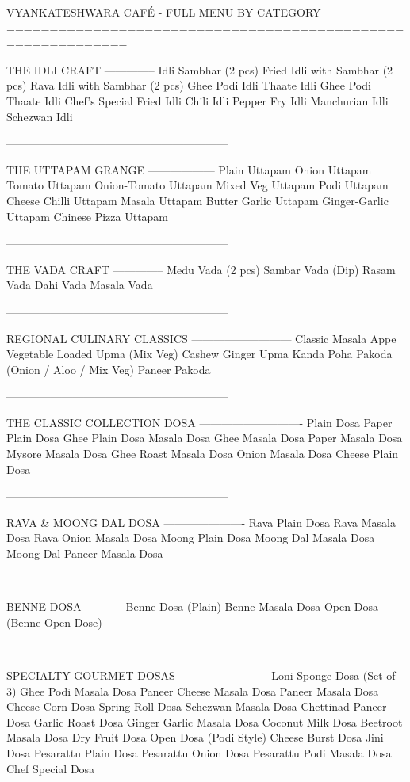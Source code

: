 VYANKATESHWARA CAFÉ - FULL MENU BY CATEGORY
============================================================

THE IDLI CRAFT
--------------
Idli Sambhar (2 pcs)
Fried Idli with Sambhar (2 pcs)
Rava Idli with Sambhar (2 pcs)
Ghee Podi Idli
Thaate Idli
Ghee Podi Thaate Idli
Chef's Special Fried Idli
Chili Idli
Pepper Fry Idli
Manchurian Idli
Schezwan Idli

------------------------------------------------------------

THE UTTAPAM GRANGE
------------------
Plain Uttapam
Onion Uttapam
Tomato Uttapam
Onion-Tomato Uttapam
Mixed Veg Uttapam
Podi Uttapam
Cheese Chilli Uttapam
Masala Uttapam
Butter Garlic Uttapam
Ginger-Garlic Uttapam
Chinese Pizza Uttapam

------------------------------------------------------------

THE VADA CRAFT
--------------
Medu Vada (2 pcs)
Sambar Vada (Dip)
Rasam Vada
Dahi Vada
Masala Vada

------------------------------------------------------------

REGIONAL CULINARY CLASSICS
---------------------------
Classic Masala Appe
Vegetable Loaded Upma (Mix Veg)
Cashew Ginger Upma
Kanda Poha
Pakoda (Onion / Aloo / Mix Veg)
Paneer Pakoda

------------------------------------------------------------

THE CLASSIC COLLECTION DOSA
----------------------------
Plain Dosa
Paper Plain Dosa
Ghee Plain Dosa
Masala Dosa
Ghee Masala Dosa
Paper Masala Dosa
Mysore Masala Dosa
Ghee Roast Masala Dosa
Onion Masala Dosa
Cheese Plain Dosa

------------------------------------------------------------

RAVA & MOONG DAL DOSA
----------------------
Rava Plain Dosa
Rava Masala Dosa
Rava Onion Masala Dosa
Moong Plain Dosa
Moong Dal Masala Dosa
Moong Dal Paneer Masala Dosa

------------------------------------------------------------

BENNE DOSA
----------
Benne Dosa (Plain)
Benne Masala Dosa
Open Dosa (Benne Open Dose)

------------------------------------------------------------

SPECIALTY GOURMET DOSAS
------------------------
Loni Sponge Dosa (Set of 3)
Ghee Podi Masala Dosa
Paneer Cheese Masala Dosa
Paneer Masala Dosa
Cheese Corn Dosa
Spring Roll Dosa
Schezwan Masala Dosa
Chettinad Paneer Dosa
Garlic Roast Dosa
Ginger Garlic Masala Dosa
Coconut Milk Dosa
Beetroot Masala Dosa
Dry Fruit Dosa
Open Dosa (Podi Style)
Cheese Burst Dosa
Jini Dosa
Pesarattu Plain Dosa
Pesarattu Onion Dosa
Pesarattu Podi Masala Dosa
Chef Special Dosa

